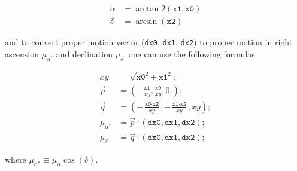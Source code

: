 \begin{equation}
\begin{aligned}
\alpha &= \arctan2(\texttt{x1}, \texttt{x0})\\
\delta &= \arcsin(\texttt{x2})
\end{aligned}
\end{equation}

and to convert proper motion vector (\texttt{dx0}, \texttt{dx1}, \texttt{dx2}) to 
proper motion in right ascension $\mu_{\alpha^*}$ and declination $\mu_{\delta}$, 
one can use the following formulas:

\begin{equation}
\begin{aligned}
	xy &= \sqrt{\texttt{x0}^2 + \texttt{x1}^2}; \\
	\vec{p} &= \left(-\frac{\texttt{x1}}{xy}, \frac{\texttt{x0}}{xy}, 0.\right); \\
	\vec{q} &= \left(-\frac{\texttt{x0} \cdot \texttt{x2}}{xy}, -\frac{\texttt{x1} \cdot \texttt{x2}}{xy}, xy\right);\\
	\mu_{\alpha^*} &= \vec{p} \cdot \left(\texttt{dx0}, \texttt{dx1}, \texttt{dx2}\right); \\
	\mu_{\delta} &= \vec{q} \cdot \left(\texttt{dx0}, \texttt{dx1}, \texttt{dx2}\right);
\end{aligned}
\end{equation}

where $\mu_{\alpha^*}\equiv\mu_{\alpha}\cos{(\delta)}$.


